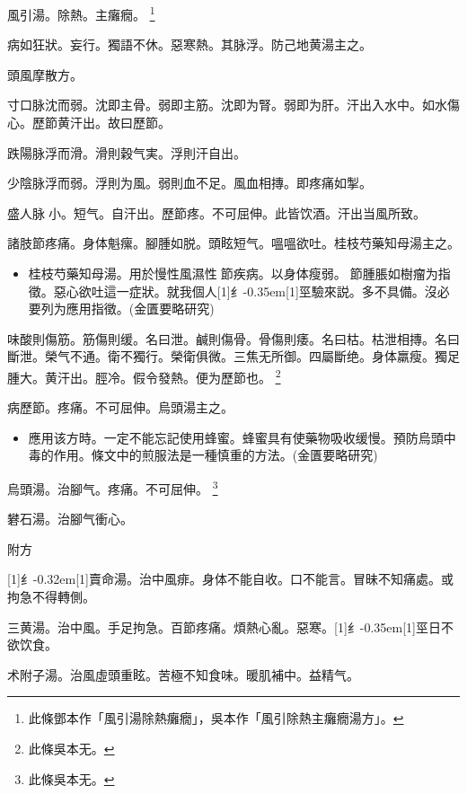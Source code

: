 \documentclass[11pt,oneside,b5paper]{ctexbook}
\begin{document}
\begin{flushleft}
風引湯。除熱。主癱癇。
\footnote{此條鄧本作「風引湯除熱癱癇」，吳本作「風引除熱主癱癇湯方」。}

病如狂狀。妄行。獨語不休。惡寒熱。其脉浮。防己地黄湯主之。

頭風摩散方。

寸口脉沈而弱。沈即主骨。弱即主筋。沈即为腎。弱即为肝。汗出入水中。如水傷心。歷節黄汗出。故曰歷節。

跌陽脉浮而滑。滑則穀气実。浮則汗自出。

少陰脉浮而弱。浮則为風。弱則血不足。風血相摶。即疼痛如掣。

盛人脉{𬈧}小。短气。自汗出。歷節疼。不可屈伸。此皆饮酒。汗出当風所致。

諸肢節疼痛。身体魁瘰。腳腫如脱。頭眩短气。嗢嗢欲吐。桂枝芍藥知母湯主之。

\begin{itemize}
\item 桂枝芍藥知母湯。用於慢性風濕性{𬮦}節疾病。以身体瘦弱。{𬮦}節腫脹如樹瘤为指徵。惡心欲吐這一症狀。就我個人{\hbox{\scalebox{0.68}[1]{纟}\kern-0.35em\scalebox{0.64}[1]{巠}}}驗來説。多不具備。沒必要列为應用指徵。(金匱要略研究)
\end{itemize}

味酸則傷筋。筋傷則缓。名曰泄。鹹則傷骨。骨傷則痿。名曰枯。枯泄相摶。名曰斷泄。榮气不通。衛不獨行。榮衛俱微。三焦无所御。四屬斷绝。身体羸瘦。獨足腫大。黄汗出。脛冷。假令發熱。便为歷節也。
\footnote{此條吳本无。}

病歷節。疼痛。不可屈伸。烏頭湯主之。

\begin{itemize}
\item 應用该方時。一定不能忘記使用蜂蜜。蜂蜜具有使藥物吸收缓慢。預防烏頭中毒的作用。條文中的煎服法是一種慎重的方法。(金匱要略研究)
\end{itemize}

烏頭湯。治腳气。疼痛。不可屈伸。
\footnote{此條吳本无。}

礬石湯。治腳气衝心。

附方

{\hbox{\scalebox{0.6}[1]{纟}\kern-0.32em\scalebox{0.7}[1]{賣}}}命湯。治中風痱。身体不能自收。口不能言。冒昧不知痛處。或拘急不得轉側。

三黄湯。治中風。手足拘急。百節疼痛。煩熱心亂。惡寒。{\hbox{\scalebox{0.68}[1]{纟}\kern-0.35em\scalebox{0.64}[1]{巠}}}日不欲饮食。

术附子湯。治風虛頭重眩。苦極不知食味。暖肌補中。益精气。


\end{flushleft}
\end{document}
